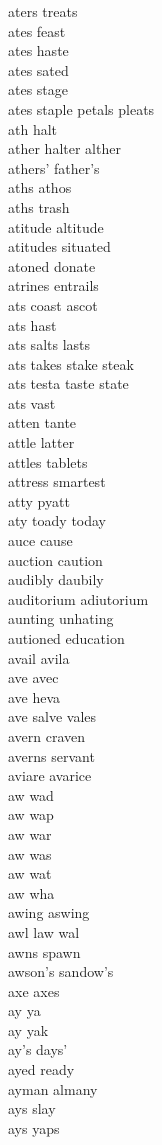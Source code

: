 aters treats \\
ates feast \\
ates haste \\
ates sated \\
ates stage \\
ates staple petals pleats  \\
ath halt \\
ather halter alther \\
athers' father's \\
aths athos \\
aths trash \\
atitude altitude \\
atitudes situated\\
atoned donate\\
atrines entrails \\
ats coast ascot  \\
ats hast \\
ats salts lasts  \\
ats takes stake steak  \\
ats testa taste state  \\
ats vast \\
atten tante\\
attle latter \\
attles tablets \\
attress smartest \\
atty pyatt \\
aty toady today  \\
auce cause \\
auction caution\\
audibly daubily\\
auditorium adiutorium\\
aunting unhating \\
autioned education \\
avail avila\\
ave avec \\
ave heva \\
ave salve vales  \\
avern craven \\
averns servant \\
aviare avarice \\
aw wad \\
aw wap \\
aw war \\
aw was \\
aw wat \\
aw wha \\
awing aswing \\
awl law wal\\
awns spawn \\
awson's sandow's \\
axe axes \\
ay ya\\
ay yak \\
ay's days' \\
ayed ready \\
ayman almany \\
ays slay \\
ays yaps \\

